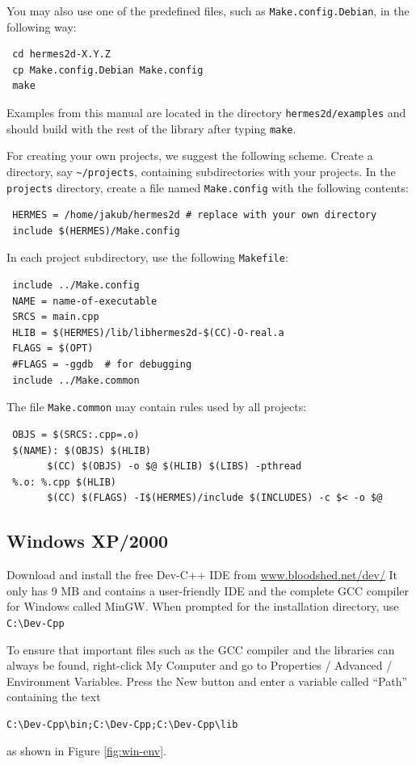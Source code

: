 You may also use one of the predefined files, such as {\tt Make.config.Debian},
in the following way:
\begin{lstlisting}
 cd hermes2d-X.Y.Z
 cp Make.config.Debian Make.config
 make
\end{lstlisting}

Examples from this manual are located in the directory {\tt hermes2d/examples} and 
should build with the rest of the library after typing {\tt make}.

For creating your own projects, we suggest the following scheme. Create a directory,
say \verb"~/projects", containing subdirectories with your projects. In the
{\tt projects} directory, create a file named {\tt Make.config} with the following
contents:
\begin{lstlisting}
 HERMES = /home/jakub/hermes2d # replace with your own directory
 include $(HERMES)/Make.config
\end{lstlisting}
In each project subdirectory, use the following {\tt Makefile}:
\begin{lstlisting}
 include ../Make.config
 NAME = name-of-executable
 SRCS = main.cpp
 HLIB = $(HERMES)/lib/libhermes2d-$(CC)-O-real.a
 FLAGS = $(OPT)
 #FLAGS = -ggdb  # for debugging
 include ../Make.common
\end{lstlisting}
The file {\tt Make.common} may contain rules used by all projects:
\begin{lstlisting}
 OBJS = $(SRCS:.cpp=.o)
 $(NAME): $(OBJS) $(HLIB)
       $(CC) $(OBJS) -o $@ $(HLIB) $(LIBS) -pthread
 %.o: %.cpp $(HLIB)
       $(CC) $(FLAGS) -I$(HERMES)/include $(INCLUDES) -c $< -o $@
\end{lstlisting}




\subsection{Windows XP/2000}

Download and install the free Dev-C++ IDE from \url{www.bloodshed.net/dev/}
It only has 9 MB and contains a user-friendly IDE and the complete GCC compiler
for Windows called MinGW. When prompted for the installation directory,
use \verb"C:\Dev-Cpp"

To ensure that important files such as the GCC compiler and the libraries can
always be found, right-click My Computer and go to Properties / Advanced / Environment Variables.
Press the New button and enter a variable called ``Path'' containing the 
text
\begin{lstlisting}
C:\Dev-Cpp\bin;C:\Dev-Cpp;C:\Dev-Cpp\lib
\end{lstlisting}
as shown in Figure \ref{fig:win-env}. 

